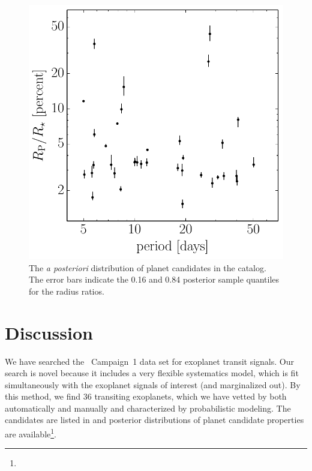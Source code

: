 \begin{figure}[p]
\begin{center}
\includegraphics{figures/ketu/candidates.pdf}
\end{center}
\caption{%
The \emph{a posteriori} distribution of planet candidates in the catalog.
The error bars indicate the 0.16 and 0.84 posterior sample quantiles for the
radius ratios.
}
\end{figure}

\begin{table}[p]
\begin{center}
\small

\end{center}
\caption{%
The catalog of planet candidates and their observable properties.
These values and their uncertainties are derived from MCMC samplings and the
numbers are computed as the 0.16, 0.5, and 0.84 posterior sample quantiles.
The coordinates are retrieved directly from the EPIC.
}
\end{table}

\section{Discussion}

We have searched the \KT\ Campaign~1 data set for exoplanet transit signals.
Our search is novel because it includes a very flexible systematics model,
which is fit simultaneously with the exoplanet signals of interest (and
marginalized out).
By this method, we find 36 transiting exoplanets, which we have vetted by both
automatically and manually and characterized by probabilistic modeling.
The candidates are listed in  and posterior distributions of planet
candidate properties are available\footnote{\datareleaseurl}.

